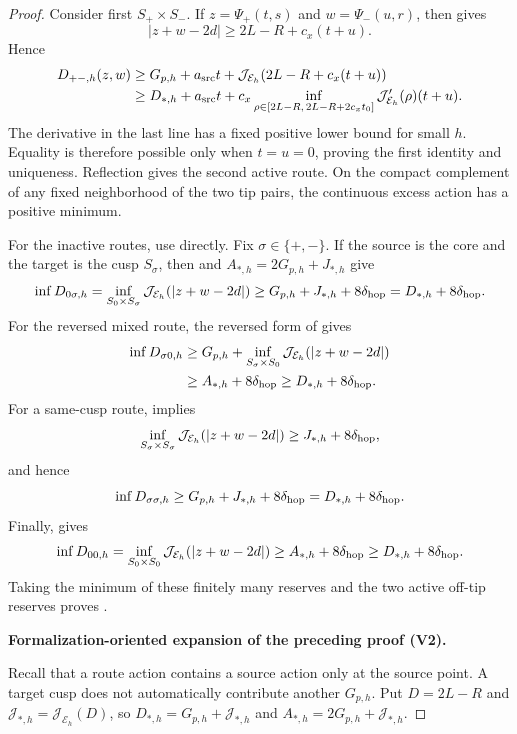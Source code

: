 \documentclass[11pt]{article}
\newcommand{\formalisationparentid}{X}
\newenvironment{formalisationaddition}[1]{\par\medskip\begingroup\color{blue}\def\formalisationparentid{#1}\setcounter{formalizationsublemma}{0}\let\lemma\formalizationsublemma\let\endlemma\endformalizationsublemma
  \def\Eo{\mathcal E_h^\circ}\def\EE{\mathcal E_h}\def\phio{\phi_h^\circ}\def\phih{\phi_h}\def\Ho{H_h^{\rm atom}(v^\circ)}\def\Ha{H_h^{\rm atom}}\def\HL{H_h^{L}}\def\Dh{D_h}\def\Log{\operatorname{Log}}\def\ellh{\ell_h}\def\Gp{G_{p,h}}\def\Ast{A_{*,h}}\def\ahat{\widehat{\mathfrak a}_h}\def\ah{\mathfrak a_h}\def\rh{\widehat\rho_h}\def\deltah{\widehat\delta_h}\def\oldref##1{\textup{(##1)}}\def\interface##1{\par\noindent\textit{Analytical interface used here.} ##1\par}\def\finish{\par\noindent\textit{Conclusion of the formalization-oriented expansion.} }\par\noindent\textbf{Formalization-oriented expansion of the preceding proof (V2).}\par\smallskip
}{\par\endgroup\medskip
}
\newcommand{\cE}{\mathcal E}
\newcommand{\cJ}{\mathcal J}
\begin{document}
\begin{proof}
Consider first $S_+\times S_-$.  If
$z=\Psi_+(t,s)$ and $w=\Psi_-(u,r)$, then
 gives
\[
 |z+w-2d|\ge2L-R+c_x(t+u).
\]
Hence
\begin{align*}
 D_{+-,h}(z,w)
 &\ge G_{p,h}+a_{\rm src}t
 +\cJ_{\cE_h}(2L-R+c_x(t+u))\\
 &\ge D_{*,h}
 +a_{\rm src}t
 +c_x\inf_{\rho\in[2L-R,\,2L-R+2c_xt_0]}
   \cJ_{\cE_h}'(\rho)(t+u).
\end{align*}
The derivative in the last line has a fixed positive lower bound for small
$h$.  Equality is therefore possible only when $t=u=0$, proving the first
identity and uniqueness.  Reflection gives the second active route.  On the
compact complement of any fixed neighborhood of the two tip pairs, the
continuous excess action has a positive minimum.

For the inactive routes, use 
 directly.  Fix $\sigma\in\{+,-\}$.
If the source is the core and the target is the cusp $S_\sigma$, then
 and
$A_{*,h}=2G_{p,h}+J_{*,h}$ give
\[
 \inf D_{0\sigma,h}
 =\inf_{S_0\times S_\sigma}\cJ_{\cE_h}(|z+w-2d|)
 \ge G_{p,h}+J_{*,h}+8\delta_{\rm hop}
 =D_{*,h}+8\delta_{\rm hop}.
\]
For the reversed mixed route, the reversed form of
 gives
\begin{align*}
 \inf D_{\sigma0,h}
 &\ge G_{p,h}
 +\inf_{S_\sigma\times S_0}\cJ_{\cE_h}(|z+w-2d|)\\
 &\ge A_{*,h}+8\delta_{\rm hop}
 \ge D_{*,h}+8\delta_{\rm hop}.
\end{align*}
For a same-cusp route,  implies
\[
 \inf_{S_\sigma\times S_\sigma}\cJ_{\cE_h}(|z+w-2d|)
 \ge J_{*,h}+8\delta_{\rm hop},
\]
and hence
\[
 \inf D_{\sigma\sigma,h}
 \ge G_{p,h}+J_{*,h}+8\delta_{\rm hop}
 =D_{*,h}+8\delta_{\rm hop}.
\]
Finally,  gives
\[
 \inf D_{00,h}
 =\inf_{S_0\times S_0}\cJ_{\cE_h}(|z+w-2d|)
 \ge A_{*,h}+8\delta_{\rm hop}
 \ge D_{*,h}+8\delta_{\rm hop}.
\]
Taking the minimum of these finitely many reserves and the two active
off-tip reserves proves .

\begin{formalisationaddition}{L8.1}
Recall that a route action contains a source action only at the source point. A target cusp does not automatically contribute another $G_{p,h}$. Put $D=2L-R$ and $\cJ_{*,h}=\cJ_{\EE}(D)$, so $D_{*,h}=\Gp+\cJ_{*,h}$ and $\Ast=2\Gp+\cJ_{*,h}$.


\end{formalisationaddition}
\end{proof}
\end{document}
